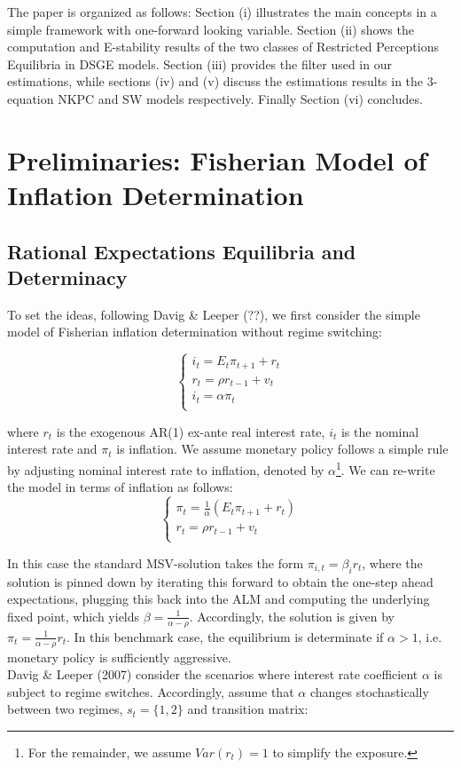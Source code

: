 \documentclass[12pt,reqno]{article}
\numberwithin{equation}{section}
\begin{document}
The paper is organized as follows: Section (i) illustrates the main concepts in a simple framework with one-forward looking variable. Section (ii) shows the  computation and E-stability results of the two classes of Restricted Perceptions Equilibria in DSGE models. Section (iii) provides the filter used in our estimations, while sections (iv) and (v) discuss the estimations results in the 3-equation NKPC and SW models respectively. Finally Section (vi) concludes.   


\section{Preliminaries: Fisherian Model of Inflation Determination}

\subsection{Rational Expectations Equilibria and Determinacy}


To set the ideas, following Davig \& Leeper (??), we first consider the simple model of Fisherian inflation determination without regime switching: 


$$
\begin{cases}
i_t = E_t \pi_{t+1} + r_t \\
r_t = \rho r_{t-1} + v_t \\
i_t = \alpha\pi_t \\
\end{cases}
$$

where $ r_t $ is the exogenous AR(1) ex-ante real interest rate, $ i_t $ is the nominal interest rate and $\pi_t $ is inflation. We assume monetary policy follows a simple rule by adjusting nominal interest rate to inflation, denoted by $\alpha$\footnote{For the remainder, we assume $Var(r_t)=1$ to simplify the exposure.}. We can re-write the model in terms of inflation as follows: \\

$$
\begin{cases}
\pi_t = \frac{1}{\alpha}(E_t \pi_{t+1} + r_t) \\
r_t = \rho r_{t-1} + v_t \\
\end{cases}
$$


In this case the standard MSV-solution takes the form $ \pi_{i,t} = \beta_i r_t $, where the solution is pinned down by iterating this forward to obtain the one-step ahead expectations, plugging this back into the ALM and computing the underlying fixed point, which yields $\beta= \frac{1}{\alpha-\rho}$. Accordingly, the solution is given by $\pi_t= \frac{1}{\alpha-\rho} r_t $. In this benchmark case, the equilibrium is determinate if $\alpha>1 $, i.e. monetary policy is sufficiently aggressive.\\
 Davig \& Leeper (2007) consider the scenarios where interest rate coefficient $\alpha$ is subject to regime switches. Accordingly, assume that $\alpha$ changes stochastically between two regimes, $s_t = \{1,2 \} $ and transition matrix:
\end{document}
